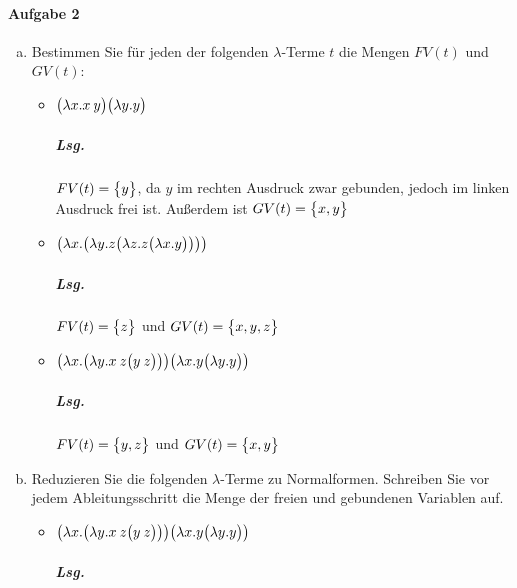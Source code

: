 \documentclass{scrreprt}
\begin{document}
\paragraph{Aufgabe 2}
\begin{enumerate}[(a)]
\item Bestimmen Sie für jeden der folgenden $\lambda$-Terme $t$ die Mengen
  $FV(t)$ und $GV(t)$:
  \begin{itemize}
  \item $\qty\big(\lambda x.x \: y)\qty\big(\lambda y.y)$

    \subparagraph{Lsg.} $FV(t) = \qty\big{y}$, da $y$ im rechten Ausdruck zwar
    gebunden, jedoch im linken Ausdruck frei ist.
    Außerdem ist $GV(t) = \qty\big{x, y}$

  \item $\qty\big(\lambda x.\qty\big(\lambda y.z \qty\big(\lambda z.z \qty\big(\lambda x.y))))$

    \subparagraph{Lsg.} $FV(t) = \qty\big{z}$ und $GV(t) = \qty\big{x, y, z}$

  \item $\qty\big(\lambda x.\qty\big(\lambda y.x \: z \qty\big(y \: z))) \qty\big(\lambda x.y \qty\big(\lambda y.y))$

    \subparagraph{Lsg.} $FV(t) = \qty\big{y, z}$ und $GV(t) = \qty\big{x, y}$
  \end{itemize}

\newpage
\item Reduzieren Sie die folgenden $\lambda$-Terme zu Normalformen.
  Schreiben Sie vor jedem Ableitungsschritt die Menge der freien und
  gebundenen Variablen auf.

  \begin{itemize}
  \item $\qty\big(\lambda x.\qty\big(\lambda y.x \: z \qty\big(y \: z))) \qty\big(\lambda x.y \qty\big(\lambda y.y))$

    \subparagraph{Lsg.} \:\\


\end{itemize}
\end{enumerate}
\end{document}

